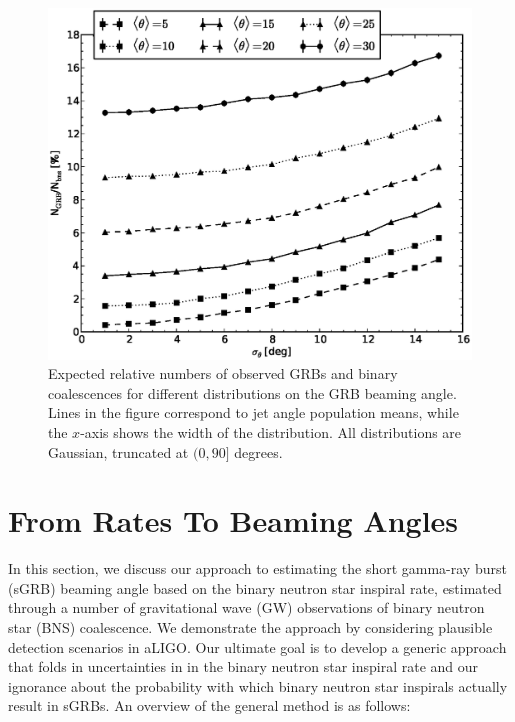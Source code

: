 \documentclass[twocolumn,nofootinbib]{revtex4-1}
\def\bns#1{binary neutron star#1 (BNS#1)\gdef\bns{BNS}}
\def\gw#1{gravitational wave#1 (GW#1)\gdef\gw{GW}}
\def\sgrb#1{short gamma-ray burst#1 (sGRB#1)\gdef\sgrb{sGRB}}
\begin{document}
\begin{figure}
\centering
\includegraphics[width=\linewidth]{theta_dist_grbfrac.eps}
\caption{\label{fig:thetapopulation} Expected relative
numbers of observed GRBs and binary coalescences for different distributions
on the GRB beaming angle.  Lines in the figure correspond to jet angle
population means, while the $x$-axis shows the width of the distribution.  All 
distributions are Gaussian, truncated at $(0, 90]$ degrees.\label{fig:thetapop}}
\end{figure}


\section{From Rates To Beaming Angles}

In this section, we discuss our approach to estimating the \sgrb{} beaming
angle based on the binary neutron star inspiral rate, estimated through a number
of \gw{} observations of \bns{} coalescence. We demonstrate the approach by
considering plausible detection scenarios in aLIGO.  Our ultimate goal is to
develop a generic approach that folds in uncertainties in in the binary neutron
star inspiral rate and our ignorance about the probability with which binary
neutron star inspirals actually result in \sgrb{s}.
%
An overview of the general method is as follows:
\end{document}
